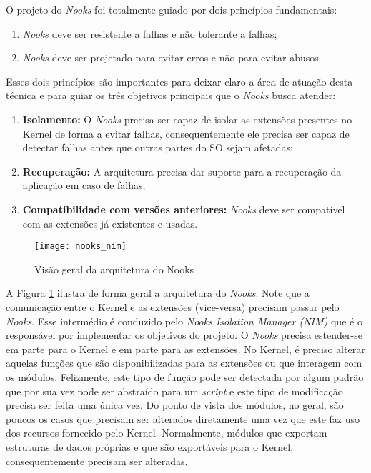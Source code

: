 O projeto do \emph{Nooks} foi totalmente guiado por dois princípios
fundamentais:

\begin{enumerate}
	\item \emph{Nooks} deve ser resistente a falhas e não tolerante a falhas;
	\item \emph{Nooks} deve ser projetado para evitar erros e não para evitar
				abusos.
\end{enumerate}

Esses dois princípios são importantes para deixar claro a área de atuação desta
técnica e para guiar os três objetivos principais que o \emph{Nooks} busca
atender:

\begin{enumerate}
	\item \textbf{Isolamento:} O \emph{Nooks} precisa ser capaz de isolar as
				extensões presentes no Kernel de forma a evitar falhas, consequentemente
				ele precisa ser capaz de detectar falhas antes que outras partes do
				SO sejam afetadas;
	\item \textbf{Recuperação:} A arquitetura precisa dar suporte para a
				recuperação da aplicação em caso de falhas;
	\item \textbf{Compatibilidade com versões anteriores:} \emph{Nooks} deve ser
				compatível com as extensões já existentes e usadas.
\end{enumerate}

\begin{figure}[!h]
  \centering
  \texttt{[image: nooks\_nim]}
  \caption{Visão geral da arquitetura do Nooks \citep{nooks}}
  \label{fig:nooks_nim}
\end{figure}

A Figura \ref{fig:nooks_nim} ilustra de forma geral a arquitetura do
\emph{Nooks}. Note que a comunicação entre o Kernel e as extensões (vice-versa)
precisam passar pelo \emph{Nooks}. Esse intermédio é conduzido pelo \emph{Nooks
Isolation Manager (NIM)} que é o responsável por implementar os objetivos do
projeto. O \emph{Nooks} precisa estender-se em parte para o Kernel e em parte
para as extensões. No Kernel, é preciso alterar aquelas funções que são
disponibilizadas para as extensões ou que interagem com os módulos. Felizmente,
este tipo de função pode ser detectada por algum padrão que por sua vez pode
ser abstraído para um \emph{script} e este tipo de modificação precisa ser
feita uma única vez. Do ponto de vista dos módulos, no geral, são poucos os
casos que precisam ser alterados diretamente uma vez que este faz uso dos
recursos fornecido pelo Kernel. Normalmente, módulos que exportam estruturas de
dados próprias e que são exportáveis para o Kernel, consequentemente precisam
ser alteradas.

